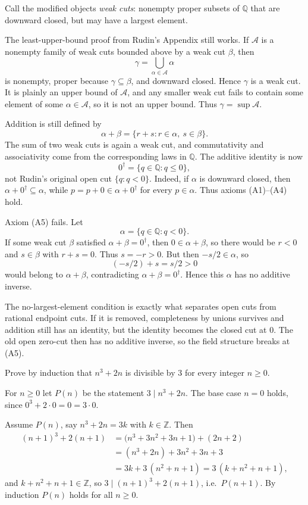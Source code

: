 \documentclass[main.tex]{subfiles}
\begin{document}
\begin{SolutionBlue}
Call the modified objects \emph{weak cuts}: nonempty proper subsets of $\mathbb Q$ that are downward
closed, but may have a largest element.

The least-upper-bound proof from Rudin's Appendix still works. If $\mathcal A$ is a nonempty family
of weak cuts bounded above by a weak cut $\beta$, then
\[
\gamma=\bigcup_{\alpha\in\mathcal A}\alpha
\]
is nonempty, proper because $\gamma\subseteq\beta$, and downward closed. Hence $\gamma$ is a weak cut.
It is plainly an upper bound of $\mathcal A$, and any smaller weak cut fails to contain some element
of some $\alpha\in\mathcal A$, so it is not an upper bound. Thus $\gamma=\sup\mathcal A$.

Addition is still defined by
\[
\alpha+\beta=\{r+s:r\in\alpha,\ s\in\beta\}.
\]
The sum of two weak cuts is again a weak cut, and commutativity and associativity come from the
corresponding laws in $\mathbb Q$. The additive identity is now
\[
0^\dagger=\{q\in\mathbb Q:q\le0\},
\]
not Rudin's original open cut $\{q:q<0\}$. Indeed, if $\alpha$ is downward closed, then
$\alpha+0^\dagger\subseteq\alpha$, while $p=p+0\in\alpha+0^\dagger$ for every $p\in\alpha$.
Thus axioms (A1)--(A4) hold.

Axiom (A5) fails. Let
\[
\alpha=\{q\in\mathbb Q:q<0\}.
\]
If some weak cut $\beta$ satisfied $\alpha+\beta=0^\dagger$, then $0\in\alpha+\beta$, so there would
be $r<0$ and $s\in\beta$ with $r+s=0$. Thus $s=-r>0$. But then $-s/2\in\alpha$, so
\[
(-s/2)+s=s/2>0
\]
would belong to $\alpha+\beta$, contradicting $\alpha+\beta=0^\dagger$. Hence this $\alpha$ has no
additive inverse.
\end{SolutionBlue}

\begin{Reflection}
The no-largest-element condition is exactly what separates open cuts from rational endpoint cuts. If
it is removed, completeness by unions survives and addition still has an identity, but the identity
becomes the closed cut at $0$. The old open zero-cut then has no additive inverse, so the field
structure breaks at (A5).
\end{Reflection}

Prove by induction that $n^3+2n$ is divisible by $3$ for every integer $n\ge 0$.

\begin{Solution}
For $n\ge 0$ let $P(n)$ be the statement $3\mid n^3+2n$. The base case $n=0$ holds, since
$0^3+2\cdot 0=0=3\cdot 0$.

Assume $P(n)$, say $n^3+2n=3k$ with $k\in\mathbb Z$. Then
\[
\begin{aligned}
(n+1)^3+2(n+1)&=\bigl(n^3+3n^2+3n+1\bigr)+(2n+2)\\
&=(n^3+2n)+3n^2+3n+3\\
&=3k+3\,(n^2+n+1)=3\,(k+n^2+n+1),
\end{aligned}
\]
and $k+n^2+n+1\in\mathbb Z$, so $3\mid(n+1)^3+2(n+1)$, i.e.\ $P(n+1)$. By induction $P(n)$ holds for
all $n\ge 0$.
\end{Solution}
\end{document}
